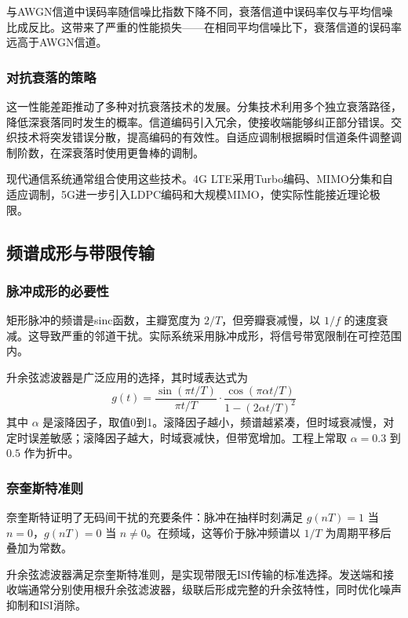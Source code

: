 与AWGN信道中误码率随信噪比指数下降不同，衰落信道中误码率仅与平均信噪比成反比。这带来了严重的性能损失——在相同平均信噪比下，衰落信道的误码率远高于AWGN信道。

\subsubsection{对抗衰落的策略}

这一性能差距推动了多种对抗衰落技术的发展。分集技术利用多个独立衰落路径，降低深衰落同时发生的概率。信道编码引入冗余，使接收端能够纠正部分错误。交织技术将突发错误分散，提高编码的有效性。自适应调制根据瞬时信道条件调整调制阶数，在深衰落时使用更鲁棒的调制。

现代通信系统通常组合使用这些技术。4G LTE采用Turbo编码、MIMO分集和自适应调制，5G进一步引入LDPC编码和大规模MIMO，使实际性能接近理论极限。

\subsection{频谱成形与带限传输}

\subsubsection{脉冲成形的必要性}

矩形脉冲的频谱是sinc函数，主瓣宽度为 $2/T$，但旁瓣衰减慢，以 $1/f$ 的速度衰减。这导致严重的邻道干扰。实际系统采用脉冲成形，将信号带宽限制在可控范围内。

升余弦滤波器是广泛应用的选择，其时域表达式为
\begin{equation}
    g(t) = \frac{\sin(\pi t/T)}{\pi t/T} \cdot \frac{\cos(\pi\alpha t/T)}{1-(2\alpha t/T)^2}
\end{equation}
其中 $\alpha$ 是滚降因子，取值0到1。滚降因子越小，频谱越紧凑，但时域衰减慢，对定时误差敏感；滚降因子越大，时域衰减快，但带宽增加。工程上常取 $\alpha = 0.3$ 到 $0.5$ 作为折中。

\subsubsection{奈奎斯特准则}

奈奎斯特证明了无码间干扰的充要条件：脉冲在抽样时刻满足 $g(nT) = 1$ 当 $n=0$，$g(nT) = 0$ 当 $n \neq 0$。在频域，这等价于脉冲频谱以 $1/T$ 为周期平移后叠加为常数。

升余弦滤波器满足奈奎斯特准则，是实现带限无ISI传输的标准选择。发送端和接收端通常分别使用根升余弦滤波器，级联后形成完整的升余弦特性，同时优化噪声抑制和ISI消除。

